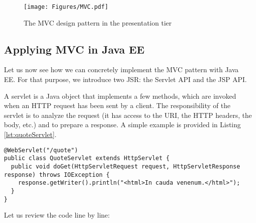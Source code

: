 \begin{figure}[]
	\centering
    \texttt{[image: Figures/MVC.pdf]}
	\caption{The MVC design pattern in the presentation tier}
  \label{fig:mvc-in-presentation-tier}
\end{figure}

\subsection{Applying MVC in Java EE}

Let us now see how we can concretely implement the \ac{MVC} pattern with Java EE. For that purpose, we introduce two \ac{JSR}: the Servlet API and the \ac{JSP} API. 

A servlet is a Java object that implements a few methods, which are invoked when an HTTP request has been sent by a client. The responsibility of the servlet is to analyze the request (it has access to the URI, the HTTP headers, the body, etc.) and to prepare a response. A simple example is provided in Listing \ref{lst:quoteServlet}. 

\vspace{10pt}
\begin{minipage}{\linewidth}
\begin{lstlisting}[frame=single]
@WebServlet("/quote")
public class QuoteServlet extends HttpServlet {
  public void doGet(HttpServletRequest request, HttpServletResponse response) throws IOException {
    response.getWriter().println("<html>In cauda venenum.</html>");
  }
}
\end{lstlisting}
\end{minipage}

Let us review the code line by line:

